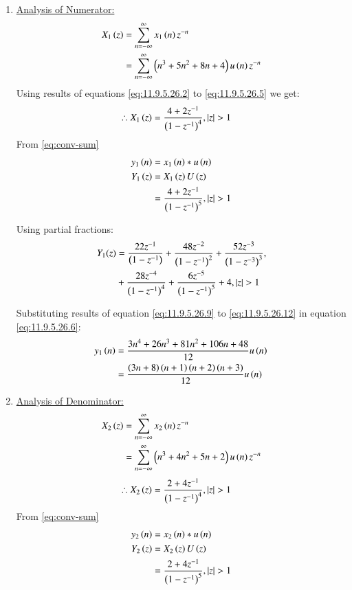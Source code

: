 \documentclass[journal,12pt,twocolumn]{IEEEtran}
\theoremstyle{remark}
\begin{document}
\begin{enumerate}[label=\arabic*.]
\item \underline {Analysis of Numerator:}\\



\begin{align}
 X_1\left(z\right) &= \sum_{n=-\infty}^\infty x_1\left(n\right)  z^{-n}\\
             &= \sum_{n=-\infty}^\infty \left(n^{3} + 5n^{2} + 8n + 4\right) u\left(n\right) z^{-n}
\end{align}
Using results of equations \eqref{eq:11.9.5.26.2} to \eqref{eq:11.9.5.26.5} we get:
\begin{align}
 \therefore   X_1\left(z\right)&= \frac{4+2z^{-1}}{\left(1-z^{-1}\right)^4} ,   \left\vert z\right\vert >1 
\end{align}
From \eqref{eq:conv-sum}
\begin{align}
y_1\left(n\right) &= x_1\left(n\right)\ast u\left(n\right)\\
    Y_1\left(z\right) &= X_1\left(z\right) U\left(z\right) \\
 &= \frac{4+2z^{-1}}{\left(1-z^{-1}\right)^5} , \left\vert z\right\vert> 1 
\end{align}

Using partial fractions:
\begin{align}
    Y_1(z) &= \frac{22z^{-1}}{\left(1-z^{-1}\right)} + \frac{48z^{-2}}{\left(1-z^{-1}\right)^2} + \frac{52z^{-3}}{\left(1-z^{-3}\right)^3} , \label{eq:11.9.5.26.6}\\
    &+ \frac{28z^{-4}}{\left(1-z^{-1}\right)^4}+\frac{6z^{-5}}{\left(1-z^{-1}\right)^5}+4 , \left\vert z\right\vert>1 \notag 
\end{align}

Substituting results of equation \eqref{eq:11.9.5.26.9} to \eqref{eq:11.9.5.26.12} in equation \eqref{eq:11.9.5.26.6}:
\begin{align}
    y_1\left(n\right) &= \frac{3n^4 + 26n^3 + 81n^2 + 106n + 48}{12}u\left(n\right)\\
    &= \frac{\left(3n+8\right)\left(n+1\right)\left(n+2\right)\left(n+3\right)}{12}u\left(n\right)
\end{align}

\item \underline{Analysis of Denominator:}
\begin{align}
    X_2\left(z\right) &= \sum_{n=-\infty}^\infty x_2\left(n\right) z^{-n}\\
                &= \sum_{n=-\infty}^\infty \left(n^{3}+4n^{2}+5n+2\right) u\left(n\right) z^{-n}
\end{align}
\begin{align}
   \therefore  X_2\left(z\right) &= \frac{2+4z^{-1}}{\left(1-z^{-1}\right)^4},   \left\vert z\right\vert >1   
\end{align}
From \eqref{eq:conv-sum}
\begin{align}
    y_2\left(n\right) &= x_2\left(n\right)\ast u\left(n\right)\\
    Y_2\left(z\right) &= X_2\left(z\right) U\left(z\right) \\
 &=\frac{2+4z^{-1}}{\left(1-z^{-1}\right)^5} ,   \left\vert z\right\vert >1 
\end{align}


\end{enumerate}
\end{document}

